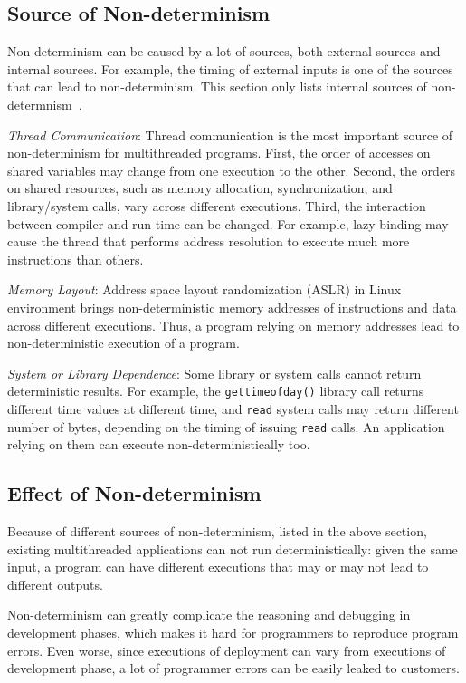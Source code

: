 \subsection{Source of Non-determinism}
Non-determinism can be caused by a lot of sources, both external sources and internal sources. For example, the timing of external inputs is one of the sources that can lead to non-determinism. This section only lists internal sources of non-determnism~\cite{costofdeterminism}. 
 
\emph{Thread Communication}: 
Thread communication is the most important source of non-determinism for multithreaded programs. 
First, the order of accesses on shared variables may change from one execution to the other. Second, the orders on shared resources, such as memory allocation, synchronization, and library/system calls, vary across different executions. 
Third, the interaction between compiler and run-time can be changed. For example, lazy binding may cause the thread that  performs address resolution to execute much more instructions than others. 

\emph{Memory Layout}: 
Address space layout randomization (ASLR) in Linux environment brings non-deterministic memory addresses of instructions and data across different executions. Thus, a program relying on memory addresses lead to non-deterministic execution of a program. 

\emph{System or Library Dependence}:
Some library or system calls cannot return deterministic results. For example, the \texttt{gettimeofday()} library call returns different time values at different time, and \texttt{read} system calls may return different number of bytes, depending on the timing of issuing \texttt{read} calls.  An application relying on them can execute non-deterministically too. 


\subsection{Effect of Non-determinism}
Because of different sources of non-determinism, listed in the above section, existing multithreaded applications can not run deterministically: given the same input, a program can have different executions that may or may not lead to different outputs. 

Non-determinism can greatly complicate the reasoning and debugging in development phases, which makes it hard for programmers to reproduce program errors. 
Even worse, since executions of deployment can vary from executions of development phase, a lot of programmer errors can be easily leaked to customers.

